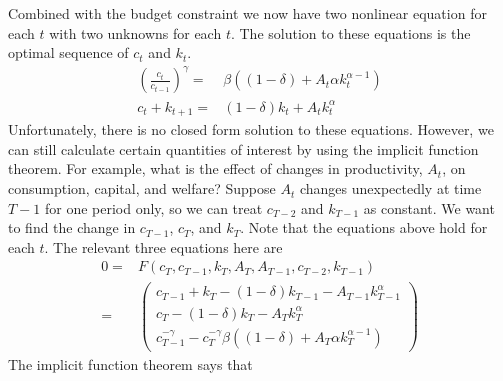 \documentclass[12pt,reqno]{amsart}
\theoremstyle{definition}
\begin{document}
Combined with the budget constraint we now have two nonlinear
equation for each $t$ with two unknowns for each $t$. The solution to
these equations is the optimal sequence of $c_t$ and $k_t$.
\begin{align*}
  \left(\frac{c_t}{c_{t-1}}\right)^{\gamma} = & \beta\left((1-\delta)
    +  A_t \alpha k_t^{\alpha-1} \right)  \\
  c_t + k_{t+1} = & (1-\delta) k_t + A_t k_t^\alpha
\end{align*}
Unfortunately, there is no closed form solution to these
equations. However, we can still calculate certain quantities of
interest by using the implicit function theorem. For example, what is
the effect of changes in productivity, $A_t$, on consumption, capital,
and welfare? Suppose $A_t$ changes unexpectedly at time $T-1$ for one
period only, so we can treat $c_{T-2}$ and $k_{T-1}$ as constant. We want
to find the change in $c_{T-1}$, $c_T$, and $k_T$. Note that the
equations above hold for each $t$. The relevant three equations here are
\begin{align*}
  0 =&  F(c_{T},c_{T-1},k_{T},A_T,A_{T-1},c_{T-2},k_{T-1}) \\
  = & \begin{pmatrix} 
    c_{T-1} + k_{T} - (1-\delta) k_{T-1} - A_{T-1} k_{T-1}^\alpha \\
    c_T - (1-\delta) k_T - A_T k_T^\alpha \\
    c_{T-1}^{-\gamma} - c_T^{-\gamma} \beta \left((1-\delta) +  A_T \alpha k_T^{\alpha-1}\right)
  \end{pmatrix}
\end{align*}
The implicit function theorem says that
\end{document}
